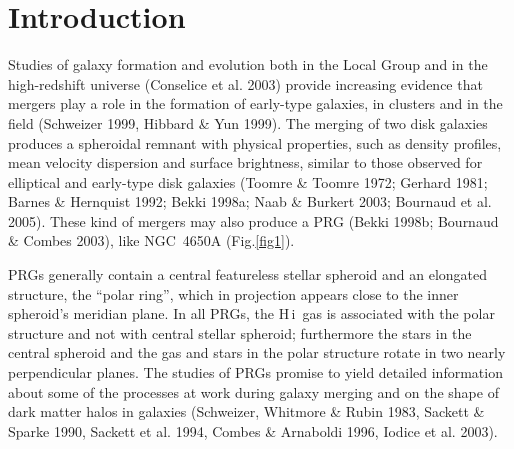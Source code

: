 \documentclass[12pt,preprint]{aastex}
\newcommand{\HI}{\mbox{H\,{\sc i}}}
\begin{document}
\begin{abstract}
We have obtained high angular resolution, high signal-to-noise spectra
of the Calcium triplet absorption lines on the photometric axes of the
stellar spheroid in the polar disk galaxy NGC~4650A.  Along the major
axis, the observed rotation and velocity dispersion measurements show
the presence of a kinematically decoupled nucleus, and a flat velocity
dispersion profile. The minor axis kinematics is determined for the
first time: along this direction some rotation is measured, and the
velocity dispersion is nearly constant and slightly increases at
larger distances from the center. The new high resolution kinematic
data suggest that the stellar component in NGC~4650A resembles a
nearly-exponential oblate spheroid supported by rotation.  The main
implications of these results on the previous mass models for
NGC~4650A are discussed. Moreover, the new kinematic data set
constraints on current models for the formation scenarios of Polar
Ring Galaxies (PRGs), supporting a slow accretion rather then a
secondary strong dissipative event.

\end{abstract}


\section{Introduction}
Studies of galaxy formation and evolution both in the Local Group and
in the high-redshift universe (Conselice et al. 2003) provide
increasing evidence that mergers play a role in the formation of
early-type galaxies, in clusters and in the field (Schweizer 1999,
Hibbard \& Yun 1999). The merging of two disk galaxies produces a
spheroidal remnant with physical properties, such as density profiles,
mean velocity dispersion and surface brightness, similar to those
observed for elliptical and early-type disk galaxies (Toomre \& Toomre
1972; Gerhard 1981; Barnes \& Hernquist 1992; Bekki 1998a; Naab \&
Burkert 2003; Bournaud et al. 2005). These kind of mergers may also
produce a PRG (Bekki 1998b; Bournaud \& Combes
2003), like NGC~4650A (Fig.\ref{fig1}).

PRGs generally contain a central featureless stellar spheroid and an
elongated structure, the ``polar ring'', which in projection appears
close to the inner spheroid's meridian plane. In all PRGs, the \HI\
gas is associated with the polar structure and not with central
stellar spheroid; furthermore the stars in the central spheroid and
the gas and stars in the polar structure rotate in two nearly
perpendicular planes. The studies of PRGs promise to yield detailed
information about some of the processes at work during galaxy merging
and on the shape of dark matter halos in galaxies (Schweizer, Whitmore
\& Rubin 1983, Sackett \& Sparke 1990, Sackett et al. 1994, Combes \&
Arnaboldi 1996, Iodice et al. 2003).
\end{document}
